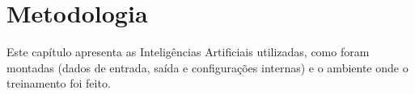 \chapter{Metodologia}
\label{chap:method}

 Este capítulo apresenta as Inteligências Artificiais utilizadas, como foram montadas (dados de entrada, saída e configurações internas) e o ambiente onde o treinamento foi feito.
 
